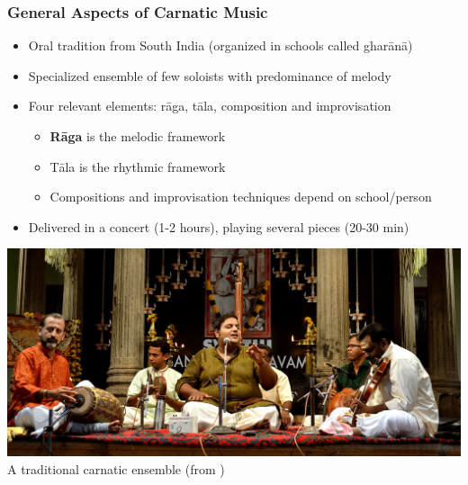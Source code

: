 \documentclass[hyperref={pdfpagelabels=false}]{beamer}
\begin{document}
     \begin{frame}
       \frametitle{General Aspects of Carnatic Music}
       \begin{itemize}[<.->]
       \item Oral tradition from South India (organized in schools called ghar\=an\=a)
       \item Specialized ensemble of few soloists with predominance of melody
       \item Four relevant elements: r\=aga, t\=ala, composition and improvisation
         \begin{itemize}[<.->]
         \item \textbf{R\=aga} is the melodic framework
         \item T\=ala is the rhythmic framework
         \item Compositions and improvisation techniques depend on school/person
         \end{itemize}
       \item Delivered in a concert (1-2 hours), playing several pieces (20-30 min)
       \end{itemize}

       \begin{center}
         \includegraphics[scale=0.15]{carnatic_ensemble.png}
                         {\scriptsize \\A traditional carnatic ensemble (from \cite[p.17]{gulati})}
       \end{center}
     \end{frame}
\end{document}
